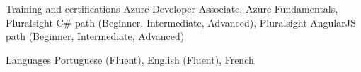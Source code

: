 \begin{cvskills}

\cvskill
{Training and certifications}
{Azure Developer Associate, 
\newline Azure Fundamentals,
\newline Pluralsight C\# path (Beginner, Intermediate, Advanced),
\newline Pluralsight AngularJS path (Beginner, Intermediate, Advanced)}


\cvskill
{Languages}
{Portuguese (Fluent), English (Fluent), French}


\end{cvskills}